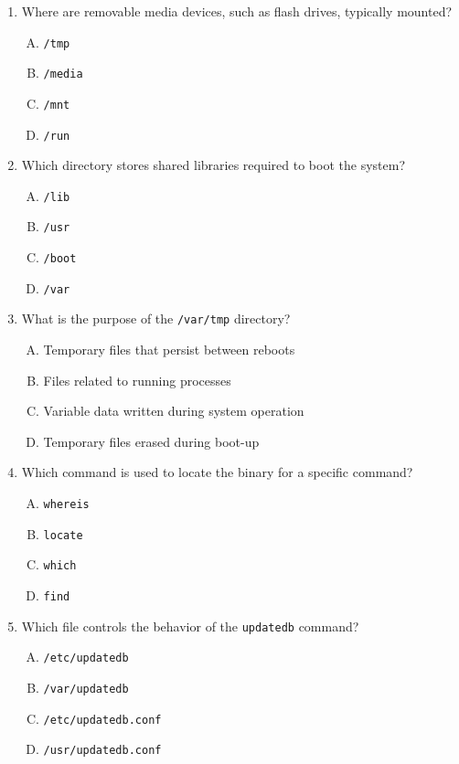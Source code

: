 \documentclass[a4paper]{report}
\begin{document}
\begin{enumerate}[1.]
    \item Where are removable media devices, such as flash drives, typically mounted?  
    \begin{enumerate}[A)]
        \item \texttt{/tmp}  
        \item \texttt{/media}  
        \item \texttt{/mnt}  
        \item \texttt{/run}  
    \end{enumerate}

    \item Which directory stores shared libraries required to boot the system?  
    \begin{enumerate}[A)]
        \item \texttt{/lib}  
        \item \texttt{/usr}  
        \item \texttt{/boot}  
        \item \texttt{/var}  
    \end{enumerate}

    \item What is the purpose of the \texttt{/var/tmp} directory?  
    \begin{enumerate}[A)]
        \item Temporary files that persist between reboots  
        \item Files related to running processes  
        \item Variable data written during system operation  
        \item Temporary files erased during boot-up  
    \end{enumerate}

    \item Which command is used to locate the binary for a specific command?  
    \begin{enumerate}[A)]
        \item \texttt{whereis}  
        \item \texttt{locate}  
        \item \texttt{which}  
        \item \texttt{find}  
    \end{enumerate}

    \item Which file controls the behavior of the \texttt{updatedb} command?  
    \begin{enumerate}[A)]
        \item \texttt{/etc/updatedb}  
        \item \texttt{/var/updatedb}  
        \item \texttt{/etc/updatedb.conf}  
        \item \texttt{/usr/updatedb.conf}  
    \end{enumerate}


\end{enumerate}
\end{document}
